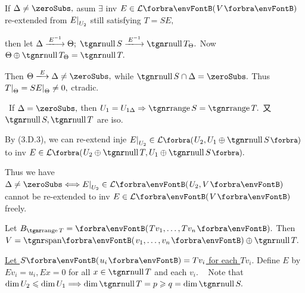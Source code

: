 If $\Delta\neq\zeroSubs,$ asum $\exists$ inv $E\in\Lm{V}$ re-extended from $E\text{\normalsize|}_{U_2}$ still satisfying $T=SE,$\par\quad
then let $\Delta\xlongrightarrow{E^{-1}}\Theta;\;\null S\xlongrightarrow{E^{-1}}\null T_\Theta.$ Now $\Theta\oplus\null T_\Theta=\null T.$\par\quad
Then $\Theta\xlongrightarrow{E}\Delta\neq\zeroSubs,$ while $\null S\cap\Delta=\zeroSubs.$ \;Thus $T\text{\normalsize|}_\Theta=SE\text{\normalsize|}_\Theta\neq 0,$ ctradic.\par\vspace{4pt}\quad
\Corollary \,\,\,If $\Delta=\zeroSubs,$ then $U_1=U_{1\Delta}\Rightarrow\range S=\range T.$ 又 $\null S,\null T$ are iso.\par\quad
By (3.D.3), we can re-extend inje $E\mmid_{U_2}\in\Lm[\BigPar]{U_2,U_1\oplus\null S}$ to inv $E\in\Lm[\BigPar]{U_2\oplus\null T,U_1\oplus\null S}.$\par\vspace{4pt}\quad
Thus we have $\Delta\neq\zeroSubs\Longleftrightarrow E\mmid_{U_2}\in\Lm{U_2,V}$ cannot be re-extended to inv $E\in\Lm{V}$ freely.\par\vspace{8pt}\quad
\Or {} \;Let $B_{\range T}=\Par{Tv_1,\dots,Tv_n}.$ Then \uline{$V=\Span{v_1,\dots,v_n}\oplus\null T.$}\par\quad
\uline{Let $S\Par{u_i}=Tv_i$ for each $Tv_i.$} \;Define $E$ by $Ev_i=u_i,Ex=0$ for all $x\in\null T$ and each $v_i.$\PfEnd\vspace{4pt}\quad
\Comment \,\,\, \;Note that $\dim U_2\leqslant\dim U_1\Longrightarrow\dim\null T=p\geqslant q=\dim\null S.$\parCom\quad

